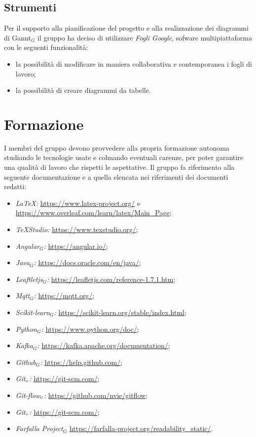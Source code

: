 \subsection{Strumenti}\label{ProcessiOrganizzativiProcessoDiPianificazioneStrumenti}
Per il supporto alla pianificazione del progetto e alla realizzazione dei diagrammi di Gannt$_G$ il gruppo ha deciso di utilizzare \textit{Fogli Google}, sofware multipiattaforma con le seguenti funzionalità:
\begin{itemize}
	\item la possibilità di modificare in maniera collaborativa e contemporanea i fogli di lavoro;
	\item la possibilità di creare diagrammi da tabelle.
\end{itemize}
\section{Formazione}\label{ProcessiOrganizzativiFormazione}
I membri del gruppo devono provvedere alla propria formazione autonoma studiando le tecnologie usate e colmando eventuali carenze, per poter garantire una qualità di lavoro che rispetti le aspettative. Il gruppo fa riferimento alla seguente documentazione e a quella elencata nei riferimenti dei documenti redatti:
\begin{itemize}
	\item \textit{\LaTeX:} \url{https://www.latex-project.org/} e \url{https://www.overleaf.com/learn/latex/Main_Page};
	\item \textit{\TeX Studio:} \url{https://www.texstudio.org/};
	\item \textit{Angular$_G$:} \url{https://angular.io/};
	\item \textit{Java$_G$:} \url{https://docs.oracle.com/en/java/};
	\item \textit{Leaftletjs$_G$:} \url{https://leafletjs.com/reference-1.7.1.htm};
	\item \textit{Mqtt$_G$:} \url{https://mqtt.org/};
	\item \textit{Scikit-learn$_G$:} \url{https://scikit-learn.org/stable/index.html};
	\item \textit{Python$_G$:} \url{https://www.python.org/doc/};
	\item \textit{Kafka$_G$:} \url{https://kafka.apache.org/documentation/};
	\item \textit{Github$_G$:} \url{https://help.github.com/};
	\item \textit{Git$_{\scaleto{G}{3pt}}$:} \url{https://git-scm.com/};
	\item \textit{Git-flow$_{\scaleto{G}{3pt}}$:} \url{https://github.com/nvie/gitflow};
	\item \textit{Git$_{\scaleto{G}{3pt}}$:} \url{ https://git-scm.com/};
	\item \textit{Farfalla Project$_G$} \url{https://farfalla-project.org/readability_static/}.
\end{itemize}